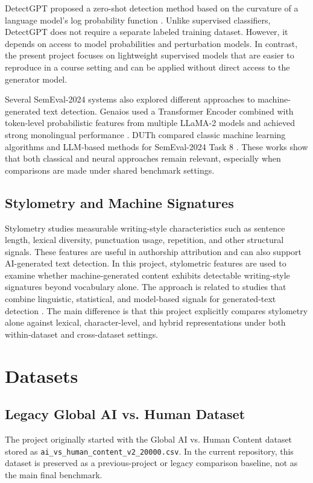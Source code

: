\documentclass[conference]{IEEEtran}
\begin{document}
DetectGPT proposed a zero-shot detection method based on the curvature of a language model's log probability function \cite{mitchell2023detectgpt}. Unlike supervised classifiers, DetectGPT does not require a separate labeled training dataset. However, it depends on access to model probabilities and perturbation models. In contrast, the present project focuses on lightweight supervised models that are easier to reproduce in a course setting and can be applied without direct access to the generator model.

Several SemEval-2024 systems also explored different approaches to machine-generated text detection. Genaios used a Transformer Encoder combined with token-level probabilistic features from multiple LLaMA-2 models and achieved strong monolingual performance \cite{sarvazyan2024genaios}. DUTh compared classic machine learning algorithms and LLM-based methods for SemEval-2024 Task 8 \cite{kyriakou2024duth}. These works show that both classical and neural approaches remain relevant, especially when comparisons are made under shared benchmark settings.

\subsection{Stylometry and Machine Signatures}
Stylometry studies measurable writing-style characteristics such as sentence length, lexical diversity, punctuation usage, repetition, and other structural signals. These features are useful in authorship attribution and can also support AI-generated text detection. In this project, stylometric features are used to examine whether machine-generated content exhibits detectable writing-style signatures beyond vocabulary alone. The approach is related to studies that combine linguistic, statistical, and model-based signals for generated-text detection \cite{mindner2023classification}. The main difference is that this project explicitly compares stylometry alone against lexical, character-level, and hybrid representations under both within-dataset and cross-dataset settings.

\section{Datasets}

\subsection{Legacy Global AI vs. Human Dataset}
The project originally started with the Global AI vs. Human Content dataset stored as \texttt{ai\_vs\_human\_content\_v2\_20000.csv}. In the current repository, this dataset is preserved as a previous-project or legacy comparison baseline, not as the main final benchmark.
\end{document}
